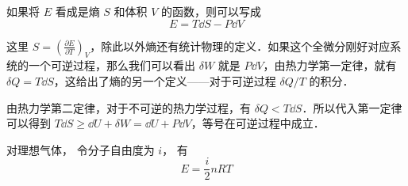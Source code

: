 如果将 $E$ 看成是熵 $S$  和体积 $V$ 的函数，则可以写成
\begin{equation}
E=T\dd S-P\dd V
\end{equation}

这里 $S=\left(\frac{\partial E}{\partial T}\right)_V$，除此以外熵还有统计物理的定义．如果这个全微分刚好对应系统的一个可逆过程，那么我们可以看出 $\delta W$ 就是 $P\dd V$，由热力学第一定律，就有 $\delta Q=T\dd S$，这给出了熵的另一个定义——对于可逆过程 $\delta Q/T$ 的积分．

由热力学第二定律，对于不可逆的热力学过程，有 $\delta Q<T\dd S$．所以代入第一定律可以得到 $T\dd S\ge \dd U+\delta W=\dd U+P\dd V$，等号在可逆过程中成立．

对理想气体， 令分子自由度为 $i$， 有
\begin{equation}
E = \frac{i}{2}n RT
\end{equation}

